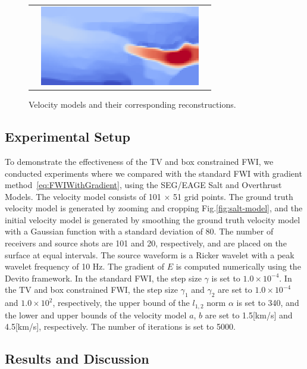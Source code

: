\begin{figure}[htbp]
\begin{tabular}{m{68mm} m{70mm} m{10mm}}
\begin{minipage}[b]{70mm}
            \caption*{Initial model}
        \end{minipage} &
        \begin{minipage}[b]{70mm}
            \centering
            \includegraphics[width=70mm]{public/pds}
            \caption*{Reconstructed with the constrained FWI}
        \end{minipage} &
    \end{tabular}
    \caption{Velocity models and their corresponding reconstructions.}
    \label{fig:velocity-models}
\end{figure}


\subsection{Experimental Setup}\label{subsec:experimental-setup}

To demonstrate the effectiveness of the TV and box constrained FWI, we conducted experiments where we compared with the standard FWI with gradient method~\eqref{eq:FWIWithGradient}, using the SEG/EAGE Salt and Overthrust Models.
The velocity model consists of 101 $\times$ 51 grid points.
The ground truth velocity model is generated by zooming and cropping Fig.\ref{fig:salt-model}, and the initial velocity model is generated by smoothing the ground truth velocity model with a Gaussian function with a standard deviation of 80.
The number of receivers and source shots are 101 and 20, respectively, and are placed on the surface at equal intervals.
The source waveform is a Ricker wavelet with a peak wavelet frequency of 10 Hz.
The gradient of $E$ is computed numerically using the Devito framework\cite{devito}.
In the standard FWI, the step size $\gamma$ is set to $1.0 \times 10^{-4}$.
In the TV and box constrained FWI, the step size $\gamma_1$ and $\gamma_2$ are set to $1.0 \times 10^{-4}$ and $1.0 \times 10^2$, respectively, the upper bound of the $l_{1,2}$ norm $\alpha$ is set to 340, and the lower and upper bounds of the velocity model $a$, $b$ are set to 1.5[km/s] and 4.5[km/s], respectively.
The number of iterations is set to 5000.


\subsection{Results and Discussion}\label{subsec:results-and-discussion}

